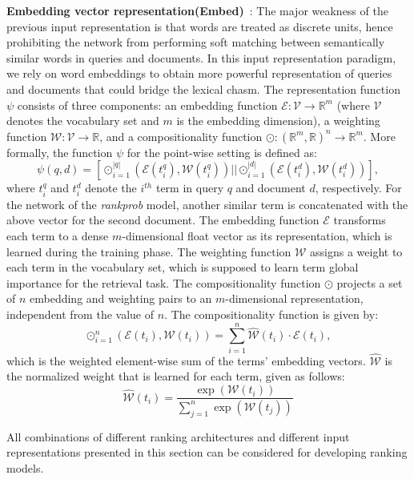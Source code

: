 \documentclass[sigconf]{acmart}
\newcommand{\modelthree}{\textit{rank\-prob} model\xspace}
\newcommand{\Feedthree}{Embedding vector representation\xspace}
\newcommand{\fthree}{Embed\xspace}
\def\:{\hskip0pt} %
\newcommand{\mypar}[1]{\vspace*{-0.1ex}\medskip\noindent\textbf{#1}~}
\begin{document}
\mypar{\label{sec:feedthree}\Feedthree (\fthree)}:
The major weakness of the previous input representation is that words are treated as discrete units, hence prohibiting the network from  performing soft matching between semantically similar words in queries and documents. In this input representation paradigm, we rely on word embeddings to obtain more powerful representation of queries and documents that could bridge the lexical chasm. %
The representation function $\psi$ consists of three components: an embedding function $\mathcal{E}: \mathcal{V} \rightarrow \mathbb{R}^{m}$ (where $\mathcal{V}$ denotes the vocabulary set and $m$ is the embedding dimension), a weighting function $\mathcal{W}: \mathcal{V} \rightarrow \mathbb{R}$, and a compositionality function $\odot: (\mathbb{R}^{m}, \mathbb{R})^n \rightarrow \mathbb{R}^{m}$. More formally, the function $\psi$ for the point-wise setting is defined as:
\begin{equation}
\psi(q, d) = [\odot_{i=1}^{|q|}(\mathcal{E}(t_i^q), \mathcal{W}(t_i^q)) || \odot_{i=1}^{|d|} (\mathcal{E}(t_i^d), \mathcal{W}(t_i^d))],
\end{equation}
where $t_i^q$ and $t_i^d$ denote the $i^{th}$ term in query $q$ and document $d$, respectively. 
For the network of the \modelthree, another similar term is concatenated with the above vector for the second document. The embedding function $\mathcal{E}$ transforms each term to a dense $m$-\:dimensional float vector as its representation, which is learned during the training phase. The weighting function $\mathcal{W}$ assigns a weight to each term in the vocabulary set, which is supposed to learn term global importance for the retrieval task. The compositionality function $\odot$ projects a set of $n$ embedding and weighting pairs to an $m$-\:dimensional representation, independent from the value of $n$. The compositionality function is given by:
\begin{equation}
\odot_{i=1}^n(\mathcal{E}(t_i), \mathcal{W}(t_i)) = \sum_{i=1}^n \widehat{\mathcal{W}}(t_i)\cdot \mathcal{E}(t_i),
\end{equation}
which is the weighted element-wise sum of the terms' embedding vectors. $\widehat{\mathcal{W}}$ is the normalized weight that is learned for each term, given as follows:
\begin{equation}
\widehat{\mathcal{W}}(t_i) = \frac{\exp(\mathcal{W}(t_i))}{\sum_{j=1}^n{ \exp(\mathcal{W}(t_j))}}
\end{equation}

\medskip
All combinations of different ranking architectures and different input representations presented in this section can be considered for developing ranking models.
\end{document}
